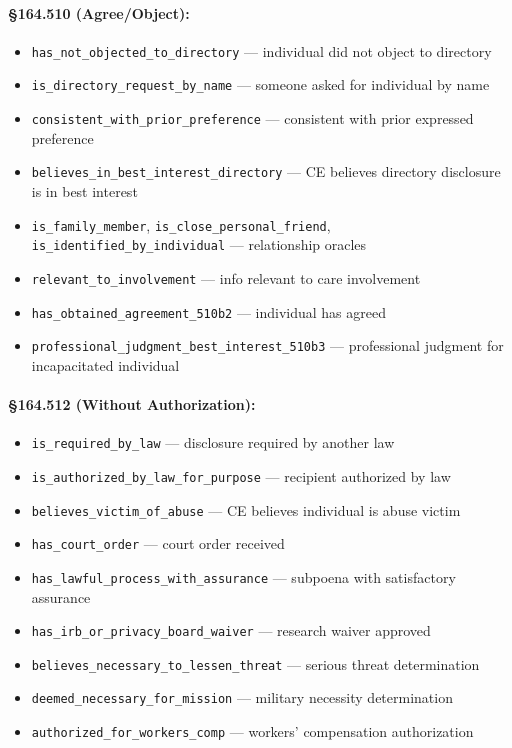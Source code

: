 \documentclass[11pt,letterpaper]{article}
\begin{document}
\paragraph{\S 164.510 (Agree/Object):}
\begin{itemize}[nosep]
  \item \texttt{has\_not\_objected\_to\_directory} --- individual did not object to directory
  \item \texttt{is\_directory\_request\_by\_name} --- someone asked for individual by name
  \item \texttt{consistent\_with\_prior\_preference} --- consistent with prior expressed preference
  \item \texttt{believes\_in\_best\_interest\_directory} --- CE believes directory disclosure is in best interest
  \item \texttt{is\_family\_member}, \texttt{is\_close\_personal\_friend}, \texttt{is\_identified\_by\_individual} --- relationship oracles
  \item \texttt{relevant\_to\_involvement} --- info relevant to care involvement
  \item \texttt{has\_obtained\_agreement\_510b2} --- individual has agreed
  \item \texttt{professional\_judgment\_best\_interest\_510b3} --- professional judgment for incapacitated individual
\end{itemize}

\paragraph{\S 164.512 (Without Authorization):}
\begin{itemize}[nosep]
  \item \texttt{is\_required\_by\_law} --- disclosure required by another law
  \item \texttt{is\_authorized\_by\_law\_for\_purpose} --- recipient authorized by law
  \item \texttt{believes\_victim\_of\_abuse} --- CE believes individual is abuse victim
  \item \texttt{has\_court\_order} --- court order received
  \item \texttt{has\_lawful\_process\_with\_assurance} --- subpoena with satisfactory assurance
  \item \texttt{has\_irb\_or\_privacy\_board\_waiver} --- research waiver approved
  \item \texttt{believes\_necessary\_to\_lessen\_threat} --- serious threat determination
  \item \texttt{deemed\_necessary\_for\_mission} --- military necessity determination
  \item \texttt{authorized\_for\_workers\_comp} --- workers' compensation authorization
\end{itemize}
\end{document}
